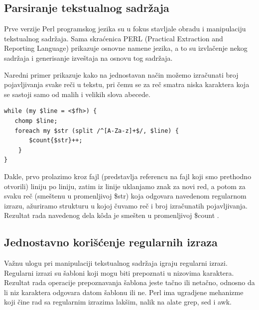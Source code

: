 \documentclass[a4paper]{article}
\begin{document}
\subsection{Parsiranje tekstualnog sadržaja}

Prve verzije Perl programskog jezika su u fokus stavljale obradu i manipulaciju tekstualnog sadržaja. Sama skra\'cenica PERL (Practical Extraction and Reporting Language) prikazuje osnovne namene jezika, a to su izvlačenje nekog sadržaja i generisanje izveštaja na osnovu tog sadržaja.

Naredni primer prikazuje kako na jednostavan način možemo izračunati broj pojavljivanja svake reči u tekstu, pri čemu se za reč smatra niska karaktera koja se sastoji samo od malih i velikih slova abecede.

\begin{lstlisting}[label=simple]
while (my $line = <$fh>) {
   chomp $line;
   foreach my $str (split /^[A-Za-z]+$/, $line) {
       $count{$str}++;
    } 
}
\end{lstlisting}


Dakle, prvo prolazimo kroz fajl (predstavlja referencu na fajl koji smo 
prethodno otvorili) liniju po liniju, zatim iz linije uklanjamo znak za novi red, a potom za svaku reč (smeštenu u promenljivoj \$str) koja odgovara navedenom regularnom izrazu, ažuriramo strukturu u kojoj čuvamo reč i broj izračunatih pojavljivanja. Rezultat rada navedenog 
dela k\^{o}da je smešten u promenljivoj \$count \cite{cooksnd}.


\subsection{Jednostavno korišćenje regularnih izraza}

Važnu ulogu pri manipulaciji tekstualnog sadržaja igraju regularni izrazi. Regularni izrazi su šabloni koji mogu biti prepoznati u nizovima karaktera. Rezultat rada operacije prepoznavanja šablona jeste tačno ili netačno, odnosno da li niz karaktera odgovara datom šablonu ili ne. Perl ima ugradjene mehanizme koji čine rad sa regularnim izrazima lakšim, nalik na alate grep, sed i awk.\cite{sed} %
\end{document}
